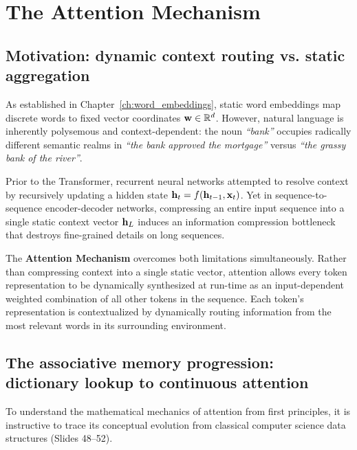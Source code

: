 \documentclass[../../../main.tex]{subfiles}
\begin{document}
\clearpage
\section{The Attention Mechanism}
\label{sec:attention_mechanism_primitive}

\subsection{Motivation: dynamic context routing vs. static aggregation}
\label{subsec:why_attention_dynamic}

As established in Chapter~\ref{ch:word_embeddings}, static word embeddings map discrete words to fixed vector coordinates $\mathbf{w} \in \mathbb{R}^d$. However, natural language is inherently polysemous and context-dependent: the noun \emph{``bank''} occupies radically different semantic realms in \emph{``the bank approved the mortgage''} versus \emph{``the grassy bank of the river''}.

Prior to the Transformer, recurrent neural networks attempted to resolve context by recursively updating a hidden state $\mathbf{h}_t = f(\mathbf{h}_{t-1}, \mathbf{x}_t)$. Yet in sequence-to-sequence encoder-decoder networks, compressing an entire input sequence into a single static context vector $\mathbf{h}_L$ induces an information compression bottleneck that destroys fine-grained details on long sequences.

The \textbf{Attention Mechanism} overcomes both limitations simultaneously. Rather than compressing context into a single static vector, attention allows every token representation to be dynamically synthesized at run-time as an input-dependent weighted combination of all other tokens in the sequence. Each token's representation is contextualized by dynamically routing information from the most relevant words in its surrounding environment.

\subsection{The associative memory progression: dictionary lookup to continuous attention}
\label{subsec:associative_memory_progression}

To understand the mathematical mechanics of attention from first principles, it is instructive to trace its conceptual evolution from classical computer science data structures (Slides 48--52).
\end{document}
